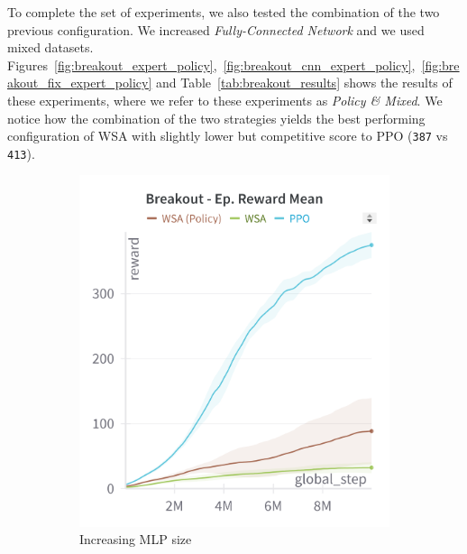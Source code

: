 To complete the set of experiments, we also tested the combination of the two previous configuration.
We increased \textit{Fully-Connected Network} and we used mixed datasets.
Figures~\ref{fig:breakout_expert_policy},~\ref{fig:breakout_cnn_expert_policy},~\ref{fig:breakout_fix_expert_policy} and Table~\ref{tab:breakout_results} shows the results of these experiments, where we refer to these experiments as \textit{Policy \& Mixed}.
We notice how the combination of the two strategies yields the best performing configuration of WSA with slightly lower but competitive score to PPO (\texttt{387} vs \texttt{413}).


\begin{figure}[ht]
    \centering
    \begin{subfigure}[b]{0.32\textwidth}
        \centering
        \includegraphics[width=\textwidth]{images/breakout_policy}
        \caption{Increasing MLP size}
        \label{fig:breakout_policy}
    \end{subfigure}
    \hfill
    \begin{subfigure}[b]{0.32\textwidth}
        \centering

\end{subfigure}
\end{figure}
